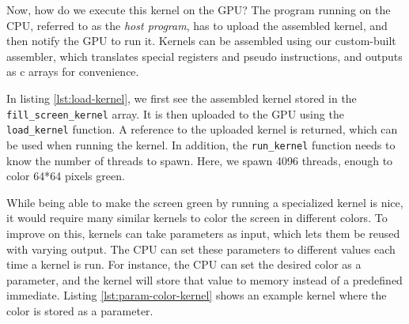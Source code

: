 \documentclass[../main/report.tex]{subfiles}
\begin{document}
Now, how do we execute this kernel on the GPU? 
The program running on the CPU, referred to as the \emph{host program},
has to upload the assembled kernel, and then notify the GPU to run it.
Kernels can be assembled using our custom-built assembler,
which translates special registers and pseudo instructions, and outputs as c arrays for convenience.



In listing \ref{lst:load-kernel}, we first see the assembled kernel stored in the
\verb/fill_screen_kernel/ array.
It is then uploaded to the GPU using the \verb/load_kernel/ function.
A reference to the uploaded kernel is returned, which can be used when running the kernel.
In addition, the \verb/run_kernel/ function needs to know the number of threads to spawn.
Here, we spawn 4096 threads, enough to color 64*64 pixels green.

While being able to make the screen green by running a specialized kernel is nice,
it would require many similar kernels to color the screen in different colors.
To improve on this, kernels can take parameters as input,
which lets them be reused with varying output.
The CPU can set these parameters to different values each time a kernel is run.
For instance, the CPU can set the desired color as a parameter,
and the kernel will store that value to memory instead of a predefined immediate.
Listing \ref{lst:param-color-kernel} shows an example kernel where the color is stored as a parameter.

\end{document}
